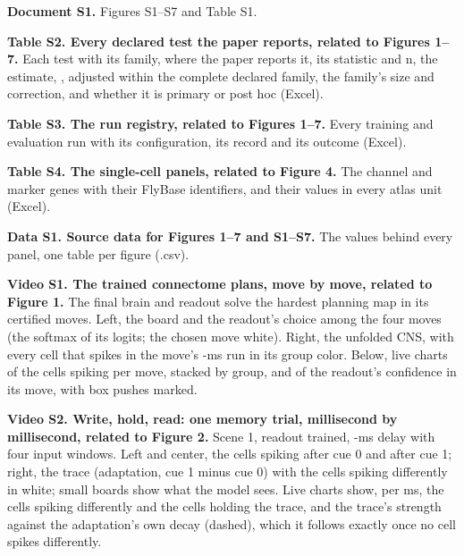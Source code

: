 \noindent\textbf{Document S1.} Figures S1--S7 and Table S1.\par
\begin{uncounted}
\medskip
\noindent\textbf{Table S2. Every declared test the paper reports, related to Figures 1--7.} Each test with its family, where the
paper reports it, its statistic and n, the estimate, \Pv{}, \Pv{} adjusted within the complete declared family, the family's
size and correction, and whether it is primary or post hoc (Excel).\par
\smallskip
\noindent\textbf{Table S3. The run registry, related to Figures 1--7.} Every training and evaluation run with its configuration,
its record and its outcome (Excel).\par
\smallskip
\noindent\textbf{Table S4. The single-cell panels, related to Figure 4.} The channel and marker genes with their FlyBase
identifiers, and their values in every atlas unit (Excel).\par
\smallskip
\noindent\textbf{Data S1. Source data for Figures 1--7 and S1--S7.} The values behind every panel, one table per figure
(.csv).\par
\smallskip
\noindent\textbf{Video S1. The trained connectome plans, move by move, related to Figure 1.} The final brain and readout solve
the hardest planning map in its  certified moves. Left, the board and the readout's choice among the four moves (the
softmax of its logits; the chosen move white). Right, the unfolded CNS, with every cell that spikes in the move's -ms
run in its group color. Below, live charts of the cells spiking per move, stacked by group, and of the readout's confidence in
its move, with box pushes marked.\par
\smallskip
\noindent\textbf{Video S2. Write, hold, read: one memory trial, millisecond by millisecond, related to Figure 2.} Scene 1,
readout trained, -ms delay with four input windows. Left and center, the cells spiking after cue 0 and after cue 1;
right, the trace (adaptation, cue 1 minus cue 0) with the cells spiking differently in white; small boards show what the model
sees. Live charts show, per ms, the cells spiking differently and the cells holding the trace, and the trace's strength against
the adaptation's own decay (dashed), which it follows exactly once no cell spikes differently.\par

\end{uncounted}
